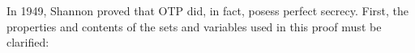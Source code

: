 \documentclass[12pt]{report}
\theoremstyle{definition}
\theoremstyle{remark}
\begin{document}
%



%


In 1949, Shannon proved that OTP did, in fact, posess perfect secrecy\cite{ShannonOTP}. First, the properties and contents of the sets and variables used in this proof must be clarified:
\end{document}
